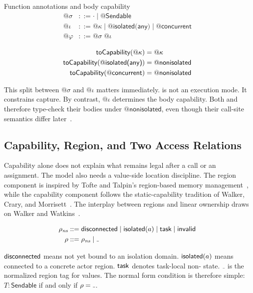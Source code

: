 \begin{definitionbox}{Function annotations and body capability}
\[
\begin{aligned}
  @\sigma &::= \cdot \mid @\textsf{Sendable} \\
  @\iota &::= @\kappa \mid @\textsf{isolated(any)} \mid @\textsf{concurrent} \\
  @\varphi &::= @\sigma\; @\iota
\end{aligned}
\]

\[
\begin{aligned}
  \textsf{toCapability}(@\kappa) &= @\kappa \\
  \textsf{toCapability}(@\textsf{isolated(any)}) &= @\textsf{nonisolated} \\
  \textsf{toCapability}(@\textsf{concurrent}) &= @\textsf{nonisolated}
\end{aligned}
\]
\end{definitionbox}

This split between $@\sigma$ and $@\iota$ matters immediately.  is not an execution mode. It constrains capture. By contrast, $@\iota$ determines the body capability. Both  and  therefore type-check their bodies under $@\textsf{nonisolated}$, even though their call-site semantics differ later~\cite{se0461}.

\subsection{Capability, Region, and Two Access Relations}

Capability alone does not explain what remains legal after a call or an assignment. The model also needs a value-side location discipline. The region component is inspired by Tofte and Talpin's region-based memory management~\cite{tofte1997region}, while the capability component follows the static-capability tradition of Walker, Crary, and Morrisett~\cite{walker2000capabilities}. The interplay between regions and linear ownership draws on Walker and Watkins~\cite{walker2001regions}.

\[
\begin{aligned}
  \rho_{\mathit{ns}} &::= \disconnected \mid \isolated(a) \mid \task \mid \invalid \\
  \rho &::= \rho_{\mathit{ns}} \mid \mathunderscore
\end{aligned}
\]

$\textsf{disconnected}$ means not yet bound to an isolation domain. $\textsf{isolated}(a)$ means connected to a concrete actor region. $\textsf{task}$ denotes task-local non- state. $\mathunderscore$ is the normalized region tag for  values. The normal form condition is therefore simple: $T : \textsf{Sendable}$ if and only if $\rho = \mathunderscore$.

